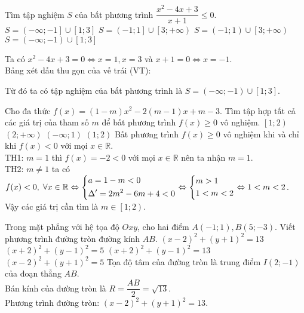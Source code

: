\begin{ex}%
	Tìm tập nghiệm $S$ của bất phương trình $\dfrac{x^2-4x+3}{x+1}\leq 0$.
	\choice
	{$S=\left(-\infty;-1\right]\cup\left[1;3\right]$}
	{$S=\left(-1;1\right]\cup\left[3;+\infty\right)$}
	{$S=\left(-1;1\right)\cup\left[3;+\infty\right)$}
	{\True $S=\left(-\infty;-1\right)\cup\left[1;3\right]$}
	\loigiai
	{Ta có $x^2-4x+3=0\Leftrightarrow x=1, x=3$ và $x+1=0\Leftrightarrow x=-1$.\\
		Bảng xét dấu thu gọn của vế trái (VT):
		\begin{center}
		\end{center}
		Từ đó ta có tập nghiệm của bất phương trình là $S=\left(-\infty;-1\right)\cup\left[1;3\right]$.
	}
\end{ex}

\begin{ex}%
	Cho đa thức $f(x)=(1-m)x^2-2(m-1)x+m-3$. Tìm tập hợp tất cả các giá trị của tham số $m$ để bất phương trình $f(x)\geq 0$ vô nghiệm.
	\choice
	{\True $\left[1;2\right)$}
	{$\left(2;+\infty\right)$}
	{$\left(-\infty;1\right)$}
	{$\left(1;2\right)$}
	\loigiai
	{Bất phương trình $f(x)\geq 0$ vô nghiệm khi và chỉ khi $f(x)<0$ với mọi $x\in\mathbb{R}$.\\
		TH1: $m=1$ thì $f(x)=-2<0$ với mọi $x\in\mathbb{R}$ nên ta nhận $m=1$.\\
		TH2: $m\neq 1$ ta có $f(x)<0,\;\forall x\in\mathbb{R}\Leftrightarrow\left\{\begin{aligned}&a=1-m<0\\&\Delta'=2m^2-6m+4<0\end{aligned}\right.\Leftrightarrow \left\{\begin{aligned}&m>1\\&1<m<2\end{aligned}\right.\Leftrightarrow 1<m<2$.\\
		Vậy các giá trị cần tìm là $m\in\left[1;2\right)$.
	}
\end{ex}

\begin{ex}%
	Trong mặt phẳng với hệ tọa độ $Oxy$, cho hai điểm $A(-1;1), B(5;-3)$. Viết phương trình đường tròn đường kính $AB$.
	\choice
	{\True $(x-2)^2+(y+1)^2=13$}
	{$(x+2)^2+(y-1)^2=5$}
	{$(x+2)^2+(y-1)^2=13$}
	{$(x-2)^2+(y+1)^2=5$}
	\loigiai
	{Tọa độ tâm của đường tròn là trung điểm $I(2;-1)$ của đoạn thẳng $AB$.\\
		Bán kính của đường tròn là $R=\dfrac{AB}{2}=\sqrt{13}$.\\Phương trình đường tròn: $(x-2)^2+(y+1)^2=13$.}
\end{ex}

